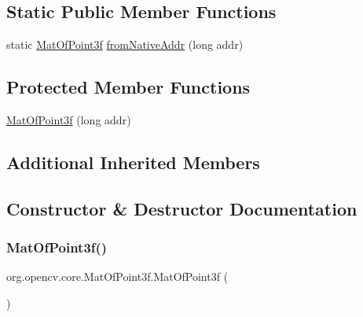 \subsection*{Static Public Member Functions}
\begin{DoxyCompactItemize}
\item 
static \mbox{\hyperlink{classorg_1_1opencv_1_1core_1_1_mat_of_point3f}{Mat\+Of\+Point3f}} \mbox{\hyperlink{classorg_1_1opencv_1_1core_1_1_mat_of_point3f_a6ad9054a1cc7e0fdaed45cd9156bf869}{from\+Native\+Addr}} (long addr)
\end{DoxyCompactItemize}
\subsection*{Protected Member Functions}
\begin{DoxyCompactItemize}
\item 
\mbox{\hyperlink{classorg_1_1opencv_1_1core_1_1_mat_of_point3f_adb5c3759a6d558d3ff23f420737d0ffc}{Mat\+Of\+Point3f}} (long addr)
\end{DoxyCompactItemize}
\subsection*{Additional Inherited Members}


\subsection{Constructor \& Destructor Documentation}
\mbox{\label{classorg_1_1opencv_1_1core_1_1_mat_of_point3f_afade9f774bea431175c6c3c2c55bd8eb}} 
\subsubsection{\texorpdfstring{Mat\+Of\+Point3f()}{MatOfPoint3f()}\hspace{0.1cm}{\footnotesize\ttfamily [1/4]}}
{\footnotesize\ttfamily org.\+opencv.\+core.\+Mat\+Of\+Point3f.\+Mat\+Of\+Point3f (\begin{DoxyParamCaption}{ }\end{DoxyParamCaption})}

\mbox{\label{classorg_1_1opencv_1_1core_1_1_mat_of_point3f_adb5c3759a6d558d3ff23f420737d0ffc}} 
